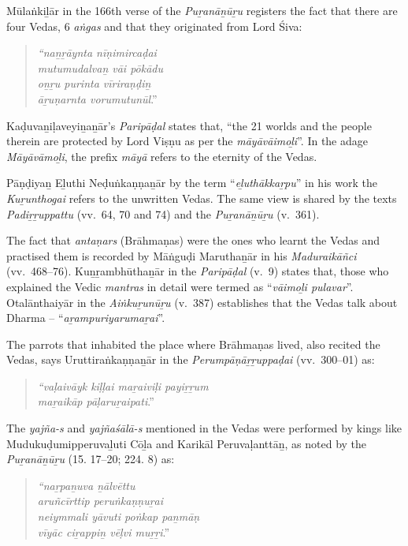 Mūlaṅkiḻār in the 166th verse of the \textit{Puṟanāṉūṟu} registers the fact that there are four Vedas, 6 \textit{aṅgas} and that they originated from Lord Śiva:

\begin{quote}
\textit{“naṉṟāynta nīṇimircaḍai}\\\textit{mutumudalvaṉ vāi pōkādu}\\\textit{oṉṟu purinta vīriraṇḍiṉ}\\\textit{āṟuṇarnta vorumutunūl}.”
\end{quote}

Kaḍuvaṉiḷaveyiṉaṉār’s \textit{Paripāḍal} states that, “the 21 worlds and the people therein are protected by Lord Viṣṇu as per the \textit{māyāvāimoḻi}”. In the adage \textit{Māyāvāmoḻi}, the prefix \textit{māyā} refers to the eternity of the Vedas.

Pāṇḍiyaṉ Eḻuthi Neḍuṅkaṇṇaṉār by the term “\textit{eḻuthākkaṟpu}” in his work the \textit{Kuṟunthogai} refers to the unwritten Vedas. The same view is shared by the texts \textit{Padiṟṟuppattu} (vv.~64, 70 and 74) and the \textit{Puṟanāṉūṟu} (v.~361).

The fact that \textit{antaṇars} (Brāhmaṇas) were the ones who learnt the Vedas and practised them is recorded by Māṅguḍi Maruthaṉār in his \textit{Maduraikāñci} (vv.~468–76). Kuṉṟambhūthaṉār in the \textit{Paripāḍal} (v.~9) states that, those who explained the Vedic \textit{mantras} in detail were termed as “\textit{vāimoḻi pulavar}”. Otalānthaiyār in the \textit{Aiṅkuṟunūṟu} (v.~387) establishes that the Vedas talk about Dharma – “\textit{aṟampuriyarumaṟai}”.

The parrots that inhabited the place where Brāhmaṇas lived, also recited the Vedas, says Uruttiraṅkaṇṇaṉār in the \textit{Perumpāṇāṟṟuppaḍai} (vv.~300–01) as:

\begin{quote}
\textit{“vaḷaivāyk kiḷḷai maṟaiviḷi payiṟṟum}\\\textit{ maṟaikāp pāḷaruṟaipati}.”
\end{quote}

The \textit{yajña-s} and \textit{yajñaśālā-s} mentioned in the Vedas were performed by kings like Mudukuḍumipperuvaḻuti Cōḻa and Karikāl Peruvaḷanttāṉ, as noted by the \textit{Puṟanāṉūṟu} (15. 17–20; 224. 8) as:

\begin{quote}
\textit{“naṟpaṉuva ṉālvēttu}\\\textit{aruñcīrttip peruṅkaṇṇuṟai}\\\textit{neiymmali yāvuti poṅkap paṉmāṇ}\\\textit{vīyāc ciṟappiṉ vēḷvi muṟṟi}.”
\end{quote}

